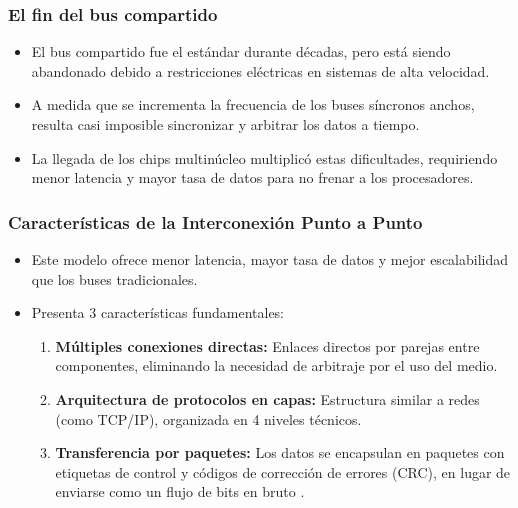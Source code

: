 \documentclass{article}
\begin{document}
\subsubsection{El fin del bus compartido}
\label{sec:org8d22d38}
\begin{itemize}
\item El bus compartido fue el estándar durante décadas, pero está siendo
abandonado debido a restricciones eléctricas en sistemas de alta
velocidad.
\item A medida que se incrementa la frecuencia de los buses síncronos
anchos, resulta casi imposible sincronizar y arbitrar los datos a
tiempo.
\item La llegada de los chips multinúcleo multiplicó estas dificultades,
requiriendo menor latencia y mayor tasa de datos para no frenar a
los procesadores.
\end{itemize}
\subsubsection{Características de la Interconexión Punto a Punto}
\label{sec:org4f61726}
\begin{itemize}
\item Este modelo ofrece menor latencia, mayor tasa de datos y mejor
escalabilidad que los buses tradicionales.
\item Presenta 3 características fundamentales:
\begin{enumerate}
\item \textbf{Múltiples conexiones directas:} Enlaces directos por parejas
entre componentes, eliminando la necesidad de arbitraje por el
uso del medio.
\item \textbf{Arquitectura de protocolos en capas:} Estructura similar a redes
(como TCP/IP), organizada en 4 niveles técnicos.
\item \textbf{Transferencia por paquetes:} Los datos se encapsulan en paquetes
con etiquetas de control y códigos de corrección de errores
(CRC), en lugar de enviarse como un flujo de bits en bruto .
\end{enumerate}
\end{itemize}
\end{document}
